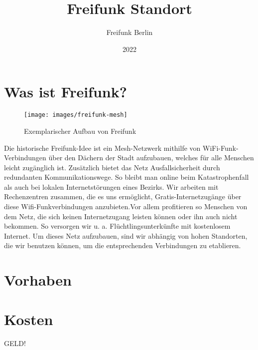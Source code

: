 

\subject{Wir machen Freifunk am}
\title{Freifunk Standort}
\author{Freifunk Berlin}
\date{2022}

\usepackage{wrapfig}
\usepackage{xcolor}
\usepackage{sectsty}
\usepackage{caption}
\usepackage{microtype}


\chapterfont{\color{freifunk-magenta}}
\allsectionsfont{\color{freifunk-magenta}}

\captionsetup[figure]{labelformat=empty}
\setlength{\headsep}{1cm}







\vspace{5cm}
\section*{Was ist Freifunk?}
\vspace{-0.5cm}
\begin{wrapfigure}{r}{0.5\textwidth}
	\centering
	\texttt{[image: images/freifunk-mesh]}
	\caption{Exemplarischer Aufbau von Freifunk}
\end{wrapfigure}
Die historische Freifunk-Idee ist ein Mesh-Netzwerk mithilfe von WiFi-Funk-Verbindungen über den Dächern der Stadt aufzubauen, welches für alle Menschen leicht zugänglich ist. Zusätzlich bietet das Netz Ausfallsicherheit durch redundanten Kommunikationswege. So bleibt man online beim Katastrophenfall als auch bei lokalen Internetstörungen eines Bezirks. Wir arbeiten mit Rechenzentren zusammen, die es uns ermöglicht, Gratis-Internetzugänge über diese Wifi-Funkverbindungen anzubieten.Vor allem profitieren so Menschen von dem Netz, die sich keinen Internetzugang leisten können oder ihn auch nicht bekommen. So versorgen wir u. a. Flüchtlingsunterkünfte mit kostenlosem Internet. Um dieses Netz aufzubauen, sind wir abhängig von hohen Standorten, die wir benutzen können, um die entsprechenden Verbindungen zu etablieren. 
\section*{Vorhaben}
\section*{Kosten}
GELD!

